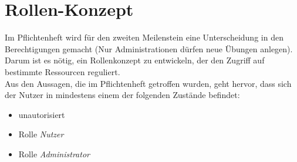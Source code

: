 \section{Rollen-Konzept}
\label{sec:rollen-konzept}
Im Pflichtenheft wird für den zweiten Meilenstein eine Unterscheidung in den Berechtigungen gemacht (Nur Administrationen dürfen neue Übungen anlegen). Darum ist es nötig, ein Rollenkonzept zu entwickeln, der den Zugriff auf bestimmte Ressourcen reguliert. \\
Aus den Aussagen, die im Pflichtenheft getroffen wurden, geht hervor, dass sich der Nutzer in mindestens einem der folgenden Zustände befindet:
\begin{itemize}
\item unautorisiert
\item Rolle \textit{Nutzer}
\item Rolle \textit{Administrator}
\end{itemize}
